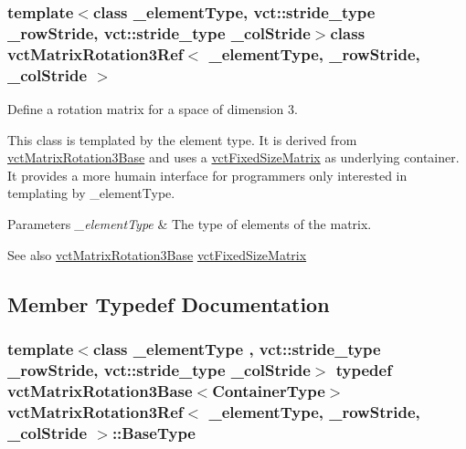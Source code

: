 \subsubsection*{template$<$class \+\_\+element\+Type, vct\+::stride\+\_\+type \+\_\+row\+Stride, vct\+::stride\+\_\+type \+\_\+col\+Stride$>$class vct\+Matrix\+Rotation3\+Ref$<$ \+\_\+element\+Type, \+\_\+row\+Stride, \+\_\+col\+Stride $>$}

Define a rotation matrix for a space of dimension 3. 

This class is templated by the element type. It is derived from \hyperlink{classvct_matrix_rotation3_base}{vct\+Matrix\+Rotation3\+Base} and uses a \hyperlink{classvct_fixed_size_matrix}{vct\+Fixed\+Size\+Matrix} as underlying container. It provides a more humain interface for programmers only interested in templating by \+\_\+element\+Type.


\begin{DoxyParams}{Parameters}
{\em \+\_\+element\+Type} & The type of elements of the matrix.\\
\hline
\end{DoxyParams}
\begin{DoxySeeAlso}{See also}
\hyperlink{classvct_matrix_rotation3_base}{vct\+Matrix\+Rotation3\+Base} \hyperlink{classvct_fixed_size_matrix}{vct\+Fixed\+Size\+Matrix} 
\end{DoxySeeAlso}


\subsection{Member Typedef Documentation}
\hypertarget{classvct_matrix_rotation3_ref_a6710fec4e5d3c1a4f8f376293b1f30dd}{}
\subsubsection[{Base\+Type}]{\setlength{\rightskip}{0pt plus 5cm}template$<$class \+\_\+element\+Type , vct\+::stride\+\_\+type \+\_\+row\+Stride, vct\+::stride\+\_\+type \+\_\+col\+Stride$>$ typedef {\bf vct\+Matrix\+Rotation3\+Base}$<${\bf Container\+Type}$>$ {\bf vct\+Matrix\+Rotation3\+Ref}$<$ \+\_\+element\+Type, \+\_\+row\+Stride, \+\_\+col\+Stride $>$\+::{\bf Base\+Type}}\label{classvct_matrix_rotation3_ref_a6710fec4e5d3c1a4f8f376293b1f30dd}
\hypertarget{classvct_matrix_rotation3_ref_acf072a6c67950bf0621787114bb016b4}{}
